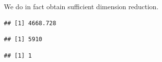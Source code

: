 \documentclass[
  ignorenonframetext,
]{beamer}
\newenvironment{Shaded}{\begin{snugshade}}{\end{snugshade}}
\newcommand{\AttributeTok}[1]{\textcolor[rgb]{0.77,0.63,0.00}{#1}}
\newcommand{\ConstantTok}[1]{\textcolor[rgb]{0.00,0.00,0.00}{#1}}
\newcommand{\DocumentationTok}[1]{\textcolor[rgb]{0.56,0.35,0.01}{\textbf{\textit{#1}}}}
\newcommand{\FunctionTok}[1]{\textcolor[rgb]{0.00,0.00,0.00}{#1}}
\newcommand{\NormalTok}[1]{#1}
\newcommand{\SpecialCharTok}[1]{\textcolor[rgb]{0.00,0.00,0.00}{#1}}
\begin{document}
\begin{frame}[fragile]{}
\protect\hypertarget{section-9}{}
We do in fact obtain sufficient dimension reduction.

\begin{Shaded}
\end{Shaded}

\begin{verbatim}
## [1] 4668.728
\end{verbatim}

\begin{Shaded}
\end{Shaded}

\begin{verbatim}
## [1] 5910
\end{verbatim}

\begin{Shaded}
\end{Shaded}

\begin{verbatim}
## [1] 1
\end{verbatim}
\end{frame}
\end{document}
